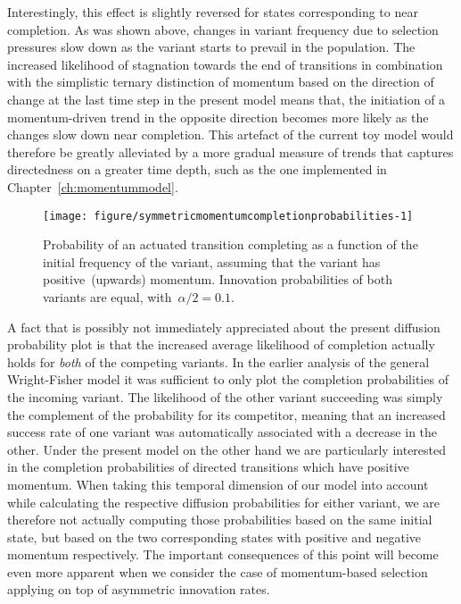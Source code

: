 Interestingly, this effect is slightly reversed for states corresponding to near completion. As was shown above, changes in variant frequency due to selection pressures slow down as the variant starts to prevail in the population.
The increased likelihood of stagnation towards the end of transitions in combination with the simplistic ternary distinction of momentum based on the direction of change at the last time step in the present model means that, the initiation of a momentum-driven trend in the opposite direction becomes more likely as the changes slow down near completion. This artefact of the current toy model would therefore be greatly alleviated by a more gradual measure of trends that captures directedness on a greater time depth, such as the one implemented in Chapter~\ref{ch:momentummodel}.

\begin{knitrout}
\color{fgcolor}\begin{figure}[htbp]

{\centering \texttt{[image: figure/symmetricmomentumcompletionprobabilities-1]} 

}

\caption[Probability of an actuated transition completing.]{Probability of an actuated transition completing as a function of the initial frequency of the variant, assuming that the variant has positive~(upwards) momentum. Innovation probabilities of both variants are equal, with~$\alpha/2=0.1$.}\label{fig:symmetricmomentumcompletionprobabilities}
\end{figure}


\end{knitrout}

A fact that is possibly not immediately appreciated about the present diffusion probability plot is that the increased average likelihood of completion actually holds for \emph{both} of the competing variants.
In the earlier analysis of the general Wright-Fisher model it was sufficient to only plot the completion probabilities of the incoming variant. The likelihood of the other variant succeeding was simply the complement of the probability for its competitor, meaning that an increased success rate of one variant was automatically associated with a decrease in the other.
 Under the present model on the other hand we are particularly interested in the completion probabilities of directed transitions which have positive momentum. When taking this temporal dimension of our model into account while calculating the respective diffusion probabilities for either variant, we are therefore not actually computing those probabilities based on the same initial state, but based on the two corresponding states with positive and negative momentum respectively. The important consequences of this point will become even more apparent when we consider the case of momentum-based selection applying on top of asymmetric innovation rates.

